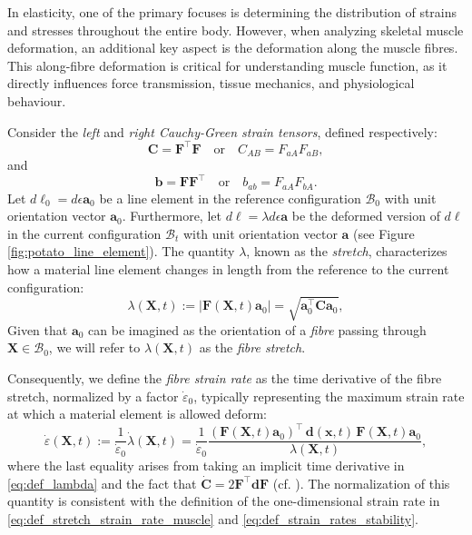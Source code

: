 \documentclass{sfuthesis}
\numberwithin{equation}{section}
\numberwithin{figure}{chapter}
\numberwithin{table}{chapter}
\theoremstyle{definition}
\def\*#1{{\mathbf{#1}}} %
\newcommand{\depsilon}{\dot{\varepsilon}}
\newcommand{\B}{\mathcal{B}}
\newcommand{\T}{\top}
\begin{document}
In elasticity, one of the primary focuses is determining the distribution of strains and stresses throughout the entire body. However, when analyzing skeletal muscle deformation, an additional key aspect is the deformation along the muscle fibres. This along-fibre deformation is critical for understanding muscle function, as it directly influences force transmission, tissue mechanics, and physiological behaviour. 

Consider the \textit{left} and \textit{right Cauchy-Green strain tensors}, defined respectively:
\begin{equation}
    \*C = \*F^\T \*F \quad \text{or} \quad C_{AB} = F_{aA} F_{aB},
\end{equation}
and
\begin{equation}
    \*b = \*F \*F^\T \quad \text{or} \quad b_{ab} = F_{aA} F_{bA}.
\end{equation}
Let $d\bm{\ell}_0 = d\epsilon \*a_0$ be a line element in the reference configuration $\B_0$ with unit orientation vector $\*a_0$. Furthermore, let $d\bm{\ell} = \lambda d\epsilon \*a$ be the deformed version of $d\bm{\ell}$ in the current configuration $\B_t$ with unit orientation vector $\*a$ (see Figure \ref{fig:potato_line_element}). The quantity $\lambda$, known as the \textit{stretch}, characterizes how a material line element changes in length from the reference to the current configuration:
\begin{equation} \label{eq:def_lambda}
\lambda(\*X,t) := |\*F(\*X,t) \*a_0| = \sqrt{\*a_0^\T \*C \*a_0},
\end{equation}
Given that $\*a_0$ can be imagined as the orientation of a \textit{fibre} passing through $\*X \in \B_0$, we will refer to $\lambda(\*X,t)$ as the \textit{fibre stretch}. 

Consequently, we define the \textit{fibre strain rate} as the time derivative of the fibre stretch, normalized by a factor $\depsilon_0$, typically representing the maximum strain rate at which a material element is allowed deform:
\begin{equation} \label{eq:def_epsilon}
\depsilon(\*X,t) := \dfrac{1}{\depsilon_0} \dot{\lambda}(\*X,t) = \dfrac{1}{\depsilon_0} \dfrac{(\*F(\*X,t)  \*a_0)^\T \, \*d(\*x,t)  \, \*F(\*X,t)  \*a_0}{\lambda(\*X,t)},
\end{equation}
where the last equality arises from taking an implicit time derivative in \eqref{eq:def_lambda} and the fact that $\dot{\*C} = 2\*F^\T \*d \*F$ (cf. \cite[Eq. (2.168)]{HolzapfelBook}). The normalization of this quantity is consistent with the definition of the one-dimensional strain rate in \eqref{eq:def_stretch_strain_rate_muscle} and \eqref{eq:def_strain_rates_stability}.
\end{document}

